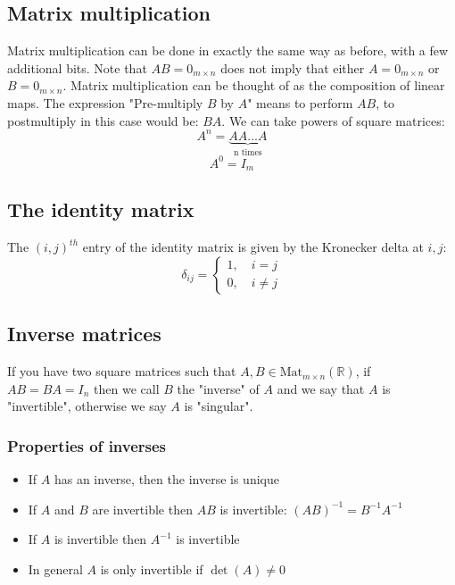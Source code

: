 \documentclass[12pt]{article}
\newcommand{\mat}[3]{\text{Mat}_{#1\times#2}(\mathbb{#3})}
\begin{document}
\subsection*{Matrix multiplication}
Matrix multiplication can be done in exactly the same way as before, with a few additional bits. Note that \(AB=0_{m\times n}\) does not imply that either \(A=0_{m\times n}\) or \(B=0_{m\times n}\). Matrix multiplication can be thought of as the composition of linear maps. The expression "Pre-multiply \(B\) by \(A\)" means to perform \(AB\), to postmultiply in this case would be: \(BA\). We can take powers of square matrices:
\[A^n=\underbrace{AA...A}_{\text{n times}}\]
\[A^0=I_m\]
\subsection*{The identity matrix}
The \((i,j)^{th}\) entry of the identity matrix is given by the Kronecker delta at \(i,j\):
\[\delta_{ij}=\begin{cases}
    1,\quad i=j \\
    0,\quad i\ne j
\end{cases}\]
\subsection*{Inverse matrices}
If you have two square matrices such that \(A,B\in\mat{m}{n}{R}\), if \(AB=BA=I_n\) then we call \(B\) the "inverse" of \(A\) and we say that \(A\) is "invertible", otherwise we say \(A\) is "singular".
\subsubsection*{Properties of inverses}
\begin{itemize}
    \item If \(A\) has an inverse, then the inverse is unique
    \item If \(A\) and \(B\) are invertible then \(AB\) is invertible: \((AB)^{-1}=B^{-1}A^{-1}\)
    \item If \(A\) is invertible then \(A^{-1}\) is invertible
    \item In general \(A\) is only invertible if \(\det(A)\ne 0\)
\end{itemize}
\end{document}
